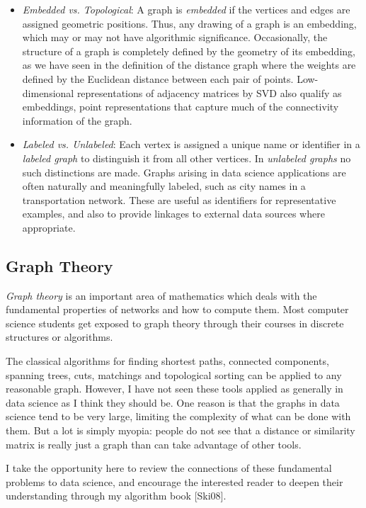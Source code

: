 \documentclass[10pt]{article}
\begin{document}
\begin{itemize}
    \item \textit{Embedded vs. Topological}: A graph is \textit{embedded} if the vertices and edges are assigned geometric positions. Thus, any drawing of a graph is an embedding, which may or may not have algorithmic significance. Occasionally, the structure of a graph is completely defined by the geometry of its embedding, as we have seen in the definition of the distance graph where the weights are defined by the Euclidean distance between each pair of points. Low-dimensional representations of adjacency matrices by SVD also qualify as embeddings, point representations that capture much of the connectivity information of the graph.
    \item \textit{Labeled vs. Unlabeled}: Each vertex is assigned a unique name or identifier in a \textit{labeled graph} to distinguish it from all other vertices. In \textit{unlabeled graphs} no such distinctions are made. Graphs arising in data science applications are often naturally and meaningfully labeled, such as city names in a transportation network. These are useful as identifiers for representative examples, and also to provide linkages to external data sources where appropriate.
\end{itemize}

\subsection{Graph Theory}
\textit{Graph theory} is an important area of mathematics which deals with the fundamental properties of networks and how to compute them. Most computer science students get exposed to graph theory through their courses in discrete structures or algorithms.

The classical algorithms for finding shortest paths, connected components, spanning trees, cuts, matchings and topological sorting can be applied to any reasonable graph. However, I have not seen these tools applied as generally in data science as I think they should be. One reason is that the graphs in data science tend to be very large, limiting the complexity of what can be done with them. But a lot is simply myopia: people do not see that a distance or similarity matrix is really just a graph than can take advantage of other tools.

I take the opportunity here to review the connections of these fundamental problems to data science, and encourage the interested reader to deepen their understanding through my algorithm book [Ski08].
\end{document}
